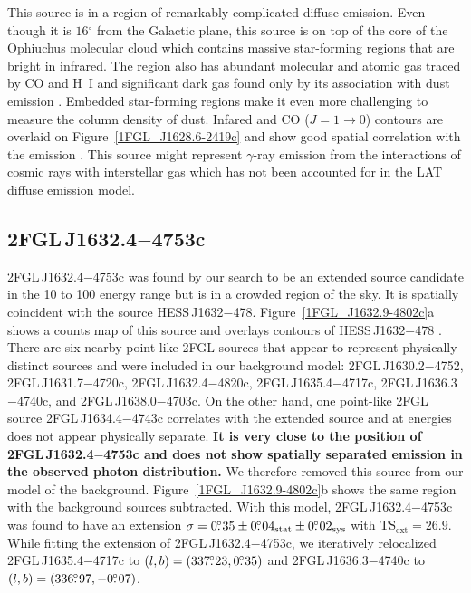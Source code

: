 \documentclass[12pt,preprint]{aastex}
\newcommand{\gev}{\text{GeV}\xspace}
\newcommand{\tev}{\text{TeV}\xspace}
\newcommand{\tsext}{{\ensuremath{\text{TS}_{\text{ext}}}}\xspace}
\newcommand{\sys}{\text{sys}\xspace}
\newcommand{\stat}{\text{stat}\xspace}
\newcommand{\degree}{\ensuremath{^\circ}\xspace}
\newcommand{\newtext}[1]{{\bfseries \color{red}#1}}
\begin{document}
This source is in a region of remarkably complicated diffuse emission.
Even though it is $16\degree$ from the Galactic plane, this source is on
top of the core of the Ophiuchus molecular cloud which contains massive
star-forming regions that are bright in infrared.  The region also has
abundant molecular and atomic gas traced by CO and H~I and significant 
dark gas found only by its association with dust emission
\citep{isabelle_dark_gass}. Embedded star-forming regions make it even
more challenging to measure the column density of dust.  Infared and 
CO ($J=1\rightarrow 0$)
contours are overlaid on Figure~\ref{1FGL_J1628.6-2419c} and show good
spatial correlation with the \gev emission \citep{iras_rho_ophiuci,co_rho_ophiuci}.
This source might 
represent $\gamma$-ray emission from the interactions of cosmic rays with
interstellar gas which has not been accounted for in the LAT diffuse
emission model.


\subsection{2FGL\,J1632.4$-$4753c}
\label{section_2FGL_J1632.4-4753c}




2FGL\,J1632.4$-$4753c was found by our search to be an extended source
candidate in the 10 \gev to 100 \gev energy range but is in a crowded
region of the sky.  It is spatially coincident with the \tev source
HESS\,J1632$-$478.  Figure~\ref{1FGL_J1632.9-4802c}a shows a counts
map of this source and overlays \tev contours of HESS\,J1632$-$478
\citep{hess_plane_survey}.  There are six nearby point-like 2FGL
sources that appear to represent physically distinct sources
and were included in our background model: 2FGL\,J1630.2$-$4752, 2FGL\,J1631.7$-$4720c, 2FGL\,J1632.4$-$4820c, 2FGL\,J1635.4$-$4717c,
2FGL\,J1636.3$-$4740c, and
2FGL\,J1638.0$-$4703c. On the
other hand, one point-like 2FGL source 2FGL\,J1634.4$-$4743c  correlates
with the extended \tev source and at \gev energies does
not appear physically separate. 
\newtext{It is very close to the position of 2FGL\,J1632.4$-$4753c
and does not show spatially separated emission in the observed photon distribution.}
We therefore removed this source from our model of the
background.  Figure~\ref{1FGL_J1632.9-4802c}b shows the same region with
the background sources subtracted.  With this model, 2FGL\,J1632.4$-$4753c
was found to have an extension $\sigma=0\fdg35\pm0\fdg04_\stat\pm0\fdg02_\sys$
with $\tsext=26.9$.  While fitting the
extension of 2FGL\,J1632.4$-$4753c, we iteratively relocalized
2FGL\,J1635.4$-$4717c to $(l,b)=(337\mbox{$.\!\!^\circ$}23,0\mbox{$.\!\!^\circ$}35)$ and
2FGL\,J1636.3$-$4740c to $(l,b)=(336\mbox{$.\!\!^\circ$}97,-0\mbox{$.\!\!^\circ$}07)$.
\end{document}
